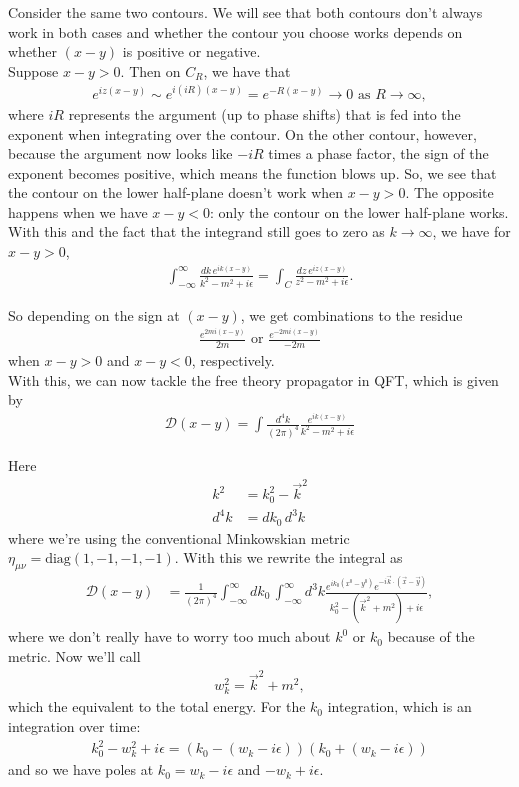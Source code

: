 \documentclass{book}
\theoremstyle{definition}
\newcommand{\f}[2]{\frac{#1}{#2}}
\newcommand{\D}{\mathcal{D}}
\begin{document}
Consider the same two contours. We will see that both contours don't always work in both cases and whether the contour you choose works depends on whether $(x-y)$ is positive or negative. \\

Suppose $x - y > 0$. Then on $C_R$, we have that
\begin{align}
e^{iz(x-y)} \sim e^{i(iR)(x-y)} = e^{-R(x-y)} \to 0 \text{ as } R\to \infty,
\end{align}
where $iR$ represents the argument (up to phase shifts) that is fed into the exponent when integrating over the contour. On the other contour, however, because the argument now looks like $-iR$ times a phase factor, the sign of the exponent becomes positive, which means the function blows up. So, we see that the contour on the lower half-plane doesn't work when $x - y > 0$. The opposite happens when we have $x - y < 0$: only the contour on the lower half-plane works. \\

With this and the fact that the integrand still goes to zero as $k\to \infty$, we have for $x - y > 0$,
\begin{align}
\int^\infty_{-\infty} \f{dk\, e^{ik(x-y)}}{k^2 -m^2 + i\epsilon} = \int_C \f{dz \, e^{iz(x-y)}}{z^2 - m^2 + i\epsilon}.
\end{align}

So depending on the sign at $(x-y)$, we get combinations to the residue 
\begin{align}
\f{e^{2mi(x-y)}}{2m} \text{ or } \f{e^{-2mi(x-y)}}{-2m}
\end{align}
when $x - y>0$ and $x-y < 0$, respectively. \\

With this, we can now tackle the free theory propagator in QFT, which is given by
\begin{align}
\D(x-y) = \int \f{d^4 k }{(2\pi)^4} \f{e^{ik(x-y)}}{k^2 - m^2 + i\epsilon}
\end{align}

Here
\begin{align}
k^2 &= k_0^2 - \vec{k}^2 \\ 
d^4k &= dk_0\,d^3k
\end{align}
where we're using the conventional Minkowskian metric $\eta_{\mu\nu} = \text{diag}(1,-1,-1,-1)$. With this we rewrite the integral as
\begin{align}
\D(x-y) &= \f{1}{(2\pi)^4} \int^\infty_{-\infty}dk_0\,\int^\infty_{-\infty}d^3k\f{e^{ik_0(x^0 - y^0)}e^{-i\vec{k}\cdot(\vec{x} - \vec{y})}}{k_0^2 - (\vec{k}^2 + m^2) + i\epsilon},
\end{align}
where we don't really have to worry too much about $k^0$ or $k_0$ because of the metric. Now we'll call
\begin{align}
w_k^2 = \vec{k}^2 + m^2,
\end{align}
which the equivalent to the total energy. For the $k_0$ integration, which is an integration over time:
\begin{align}
k_0^2 - w_k^2 + i\epsilon = (k_0 - (w_k - i\epsilon))(k_0 + (w_k -i\epsilon))
\end{align}
and so we have poles at $k_0 = w_k - i\epsilon$ and $-w_k + i\epsilon$.\\
\end{document}
